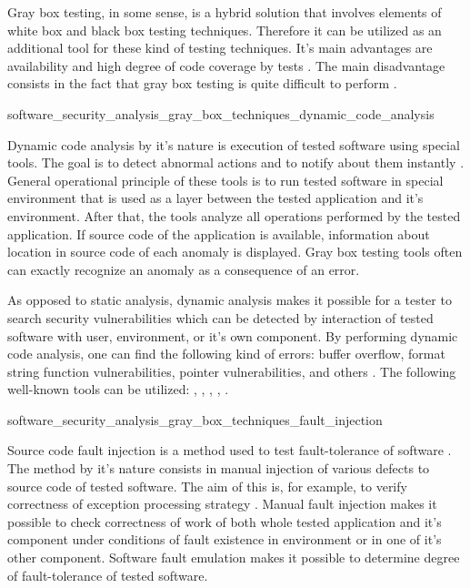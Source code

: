 %
Gray box testing, in some sense, is a hybrid solution that involves elements of white box and black box testing techniques. 
%
Therefore it can be utilized as an additional tool for these kind of testing techniques. 
%
It's main advantages are availability and high degree of code coverage by tests . 
%
The main disadvantage consists in the fact that gray box testing is quite difficult to perform . 


	{software_security_analysis_gray_box_techniques_dynamic_code_analysis}

%
Dynamic code analysis by it's nature is execution of tested software using special tools. 
%
The goal is to detect abnormal actions and to notify about them instantly . 
%
General operational principle of these tools is to run tested software in special environment that is used as a layer between the tested application and it's environment. 
%
After that, the tools analyze all operations performed by the tested application. 
%
If source code of the application is available, information about location in source code of each anomaly is displayed. 
%
Gray box testing tools often can exactly recognize an anomaly as a consequence of an error. 

%
As opposed to static analysis, dynamic analysis makes it possible for a tester to search security vulnerabilities which can be detected by interaction of tested software with user, environment, or it's own component. 
%
By performing dynamic code analysis, one can find the following kind of errors: buffer overflow, format string function vulnerabilities, pointer vulnerabilities, and others . 
%
The following well-known tools can be utilized:  ,  ,  ,  ,  . 


	{software_security_analysis_gray_box_techniques_fault_injection}

%
Source code fault injection is a method used to test fault-tolerance of software . 
%
The method by it's nature consists in manual injection of various defects to source code of tested software. 
%
The aim of this is, for example, to verify correctness of exception processing strategy . 
%
Manual fault injection makes it possible to check correctness of work of both whole tested application and it's component under conditions of fault existence in environment or in one of it's other component. 
%
Software fault emulation makes it possible to determine degree of fault-tolerance of tested software. 

